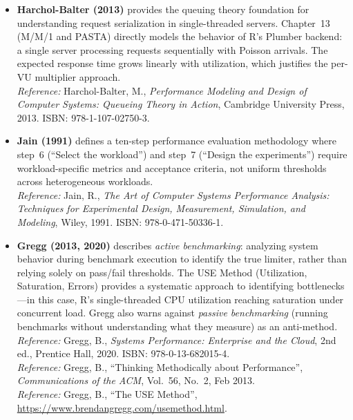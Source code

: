\documentclass[11pt,a4paper]{article}
\begin{document}
\begin{itemize}
  \item \textbf{Harchol-Balter (2013)} provides the queuing theory
        foundation for understanding request serialization in
        single-threaded servers. Chapter~13 (M/M/1 and PASTA) directly
        models the behavior of R's Plumber backend: a single server
        processing requests sequentially with Poisson arrivals. The
        expected response time grows linearly with utilization, which
        justifies the per-VU multiplier approach.\\
        \emph{Reference:} Harchol-Balter, M., \emph{Performance
        Modeling and Design of Computer Systems: Queueing Theory in
        Action}, Cambridge University Press, 2013.
        ISBN: 978-1-107-02750-3.

  \item \textbf{Jain (1991)} defines a ten-step performance evaluation
        methodology where step~6 (``Select the workload'') and step~7
        (``Design the experiments'') require workload-specific metrics
        and acceptance criteria, not uniform thresholds across
        heterogeneous workloads.\\
        \emph{Reference:} Jain, R., \emph{The Art of Computer Systems
        Performance Analysis: Techniques for Experimental Design,
        Measurement, Simulation, and Modeling}, Wiley, 1991.
        ISBN: 978-0-471-50336-1.

  \item \textbf{Gregg (2013, 2020)} describes \emph{active benchmarking}:
        analyzing system behavior during benchmark execution to identify
        the true limiter, rather than relying solely on pass/fail
        thresholds. The USE Method (Utilization, Saturation, Errors)
        provides a systematic approach to identifying bottlenecks---in
        this case, R's single-threaded CPU utilization reaching
        saturation under concurrent load. Gregg also warns against
        \emph{passive benchmarking} (running benchmarks without
        understanding what they measure) as an anti-method.\\
        \emph{Reference:} Gregg, B., \emph{Systems Performance:
        Enterprise and the Cloud}, 2nd ed., Prentice Hall, 2020.
        ISBN: 978-0-13-682015-4.\\
        \emph{Reference:} Gregg, B., ``Thinking Methodically about
        Performance'', \emph{Communications of the ACM}, Vol.~56,
        No.~2, Feb 2013.\\
        \emph{Reference:} Gregg, B., ``The USE Method'',
        \url{https://www.brendangregg.com/usemethod.html}.


\end{itemize}
\end{document}
